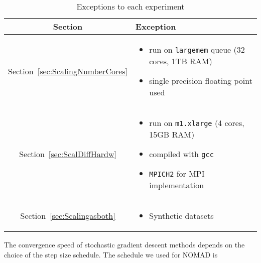\documentclass{vldb}
\begin{document}
\begin{table}[htbp]
  \centering
  \caption{Exceptions to each experiment}
  {\small
    \begin{tabular}[htbp]{|c|p{}|}
      \hline 
    Section & Exception \\
    \hline
    Section~\ref{sec:ScalingNumberCores} & 
    \mbox{}\par\vspace{-\baselineskip}
    \begin{itemize}[noitemsep,leftmargin=*,topsep=0pt,partopsep=0pt] 
    \item run on \texttt{largemem} queue (32 cores, 1TB RAM)
    \item single precision floating point used
    \end{itemize}
    \mbox{}\par\vspace{-2\baselineskip}
    \\
\hline
    Section~\ref{sec:ScalDiffHardw} & 
    \mbox{}\par\vspace{-\baselineskip}
    \begin{itemize}[noitemsep,leftmargin=*,topsep=0pt,partopsep=0pt]
    \item run on \texttt{m1.xlarge} (4 cores, 15GB RAM)
    \item compiled with \texttt{gcc}
    \item \texttt{MPICH2} for MPI implementation
    \end{itemize}
    \mbox{}\par\vspace{-2\baselineskip}\\
    \hline
    Section~\ref{sec:Scalingasboth} & 
    \mbox{}\par\vspace{-\baselineskip}
    \begin{itemize}[noitemsep,leftmargin=*,topsep=0pt,partopsep=0pt]
    \item Synthetic datasets
    \end{itemize}
    \mbox{}\par\vspace{-2\baselineskip}\\
    \hline
  \end{tabular}
  }
  \label{tab:exceptions}
\end{table}

The convergence speed of stochastic gradient descent methods depends on
the choice of the step size schedule.  The schedule we used for NOMAD
is
\end{document}
